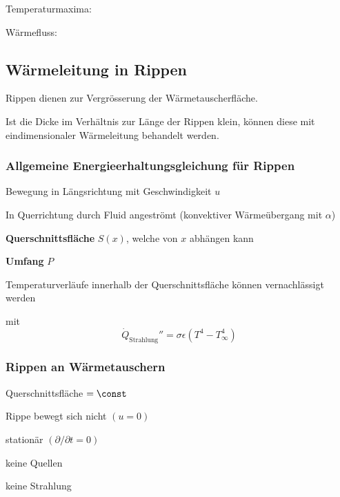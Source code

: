 		Temperaturmaxima:

		Wärmefluss:

	\subsection{Wärmeleitung in Rippen} %
		Rippen dienen zur Vergrösserung der Wärmetauscherfläche.

		Ist die Dicke im Verhältnis zur Länge der Rippen klein, können diese mit eindimensionaler Wärmeleitung behandelt werden.

		\subsubsection{Allgemeine Energieerhaltungsgleichung für Rippen} %
			\begin{tightitemize}
				\item Bewegung in Längsrichtung mit Geschwindigkeit $u$
				\item In Querrichtung durch Fluid angeströmt (konvektiver Wärmeübergang mit $\alpha$)
				\item \textbf{Querschnittsfläche} $S(x)$, welche von $x$ abhängen kann
				\item \textbf{Umfang} $P$
				\item Temperaturverläufe innerhalb der Querschnittsfläche können vernachlässigt werden
			\end{tightitemize}

			mit \[
				\dot Q_\text{Strahlung}'' = \sigma \epsilon (T^4 - T_\infty^4)
			\]

		\subsubsection{Rippen an Wärmetauschern} %
			\begin{tightitemize}
				\item Querschnittsfläche $= \const$
				\item Rippe bewegt sich nicht $(u = 0)$
				\item stationär $(\partial/\partial t = 0)$
				\item keine Quellen
				\item keine Strahlung
			\end{tightitemize}

